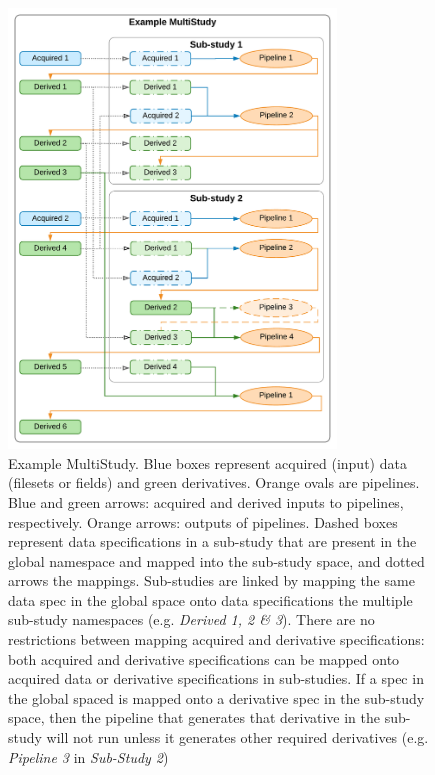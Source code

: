\begin{figure}
  \begin{center}
    \includegraphics[width=0.775\textwidth]{figures/example_multi_study}
  \caption{Example MultiStudy. Blue boxes represent acquired
(input) data (filesets or fields) and green derivatives. Orange ovals
are pipelines. Blue and green arrows: acquired and derived inputs to
pipelines, respectively. Orange arrows: outputs of pipelines. Dashed
boxes represent data specifications in a sub-study that are present in
the global namespace and mapped into the sub-study space, and dotted
arrows the mappings. Sub-studies are linked by mapping the same data
spec in the global space onto data specifications the multiple sub-study
namespaces (e.g. \emph{Derived 1, 2 \& 3}). There are no restrictions
between mapping acquired and derivative specifications: both acquired
and derivative specifications can be mapped onto acquired data or
derivative specifications in sub-studies. If a spec in the global spaced
is mapped onto a derivative spec in the sub-study space, then the
pipeline that generates that derivative in the sub-study will not run
unless it generates other required derivatives (e.g. \emph{Pipeline 3} in
\emph{Sub-Study 2})}
\end{center}
\label{fig:example_multi_study}
\end{figure}

